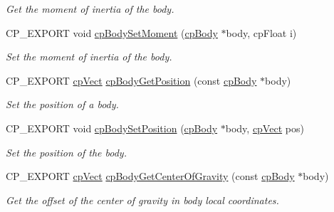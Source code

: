 \begin{DoxyCompactItemize}
\begin{DoxyCompactList}\small\item\em Get the moment of inertia of the body. \end{DoxyCompactList}\item 
\mbox{\label{group__cpBody_gab50551755486b071328e4a44a989cced}} 
C\+P\+\_\+\+E\+X\+P\+O\+RT void \hyperlink{group__cpBody_gab50551755486b071328e4a44a989cced}{cp\+Body\+Set\+Moment} (\hyperlink{structcpBody}{cp\+Body} $\ast$body, cp\+Float i)
\begin{DoxyCompactList}\small\item\em Set the moment of inertia of the body. \end{DoxyCompactList}\item 
\mbox{\label{group__cpBody_gaf339449a9bbdd7341e4567a58e021523}} 
C\+P\+\_\+\+E\+X\+P\+O\+RT \hyperlink{structcpVect}{cp\+Vect} \hyperlink{group__cpBody_gaf339449a9bbdd7341e4567a58e021523}{cp\+Body\+Get\+Position} (const \hyperlink{structcpBody}{cp\+Body} $\ast$body)
\begin{DoxyCompactList}\small\item\em Set the position of a body. \end{DoxyCompactList}\item 
\mbox{\label{group__cpBody_ga959d9f215f1102cfc0ad6e9271c64ba4}} 
C\+P\+\_\+\+E\+X\+P\+O\+RT void \hyperlink{group__cpBody_ga959d9f215f1102cfc0ad6e9271c64ba4}{cp\+Body\+Set\+Position} (\hyperlink{structcpBody}{cp\+Body} $\ast$body, \hyperlink{structcpVect}{cp\+Vect} pos)
\begin{DoxyCompactList}\small\item\em Set the position of the body. \end{DoxyCompactList}\item 
\mbox{\label{group__cpBody_ga32c08449fc0c120086b20f821d582a1f}} 
C\+P\+\_\+\+E\+X\+P\+O\+RT \hyperlink{structcpVect}{cp\+Vect} \hyperlink{group__cpBody_ga32c08449fc0c120086b20f821d582a1f}{cp\+Body\+Get\+Center\+Of\+Gravity} (const \hyperlink{structcpBody}{cp\+Body} $\ast$body)
\begin{DoxyCompactList}\small\item\em Get the offset of the center of gravity in body local coordinates. \end{DoxyCompactList}\item 

\end{DoxyCompactItemize}
